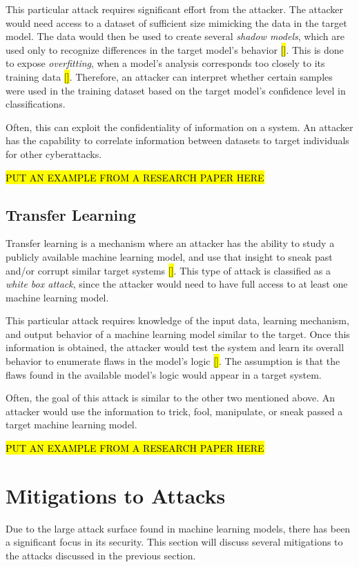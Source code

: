 \documentclass[11pt,conference]{IEEEtran}
\begin{document}
This particular attack requires significant effort from the attacker.
The attacker would need access to a dataset of sufficient size mimicking the
data in the target model. The data would then be used to create several
\emph{shadow models}, which are used only to recognize differences
in the target model's behavior \hl{[]}. This is done to expose \emph{overfitting}, when a model's analysis corresponds too
closely to its training data \hl{[]}. Therefore, an attacker can interpret whether
certain samples were used in the training dataset based on the target model's
confidence level in classifications.

Often, this can exploit the confidentiality of information on a system. An
attacker has the capability to correlate information between datasets to target
individuals for other cyberattacks.

\hl{PUT AN EXAMPLE FROM A RESEARCH PAPER HERE}

\subsection{Transfer Learning}
Transfer learning is a mechanism where an attacker has the ability to study a
publicly available machine learning model, and use that insight to sneak past
and/or corrupt similar target systems \hl{[]}. This type of attack is classified as a
\emph{white box attack}, since the attacker would need to have full access to
at least one machine learning model.

This particular attack requires knowledge of the
input data, learning mechanism, and output behavior of a machine learning model
similar to the target. Once this information is obtained, the attacker would
test the system and learn its overall behavior to enumerate flaws in the
model's logic \hl{[]}. The assumption is that the flaws found in the available model's
logic would appear in a target system.

Often, the goal of this attack is similar to the other two mentioned above. An
attacker would use the information to trick, fool, manipulate, or sneak passed
a target machine learning model.

\hl{PUT AN EXAMPLE FROM A RESEARCH PAPER HERE}

\section{Mitigations to Attacks}

Due to the large attack surface found in machine learning models, there has
been a significant focus in its security. This section will
discuss several mitigations to the attacks discussed in the previous
section. 
\end{document}
